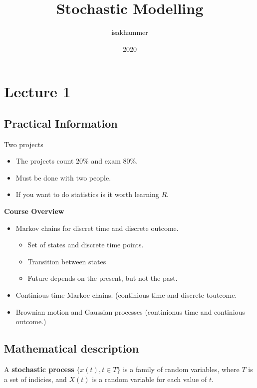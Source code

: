 \documentclass{article}
\title{Stochastic Modelling}
\author{isakhammer }
\date{2020}
\theoremstyle{remark}
\begin{document}
\maketitle
\tableofcontents
\newpage

\newpage
\section{Lecture 1}%
\label{sec:lecture_1}

\subsection{Practical Information}%
\label{sub:practical_information}

Two projects
\begin{itemize}
  \item The projects count $20 \%$ and exam $80 \%$.
  \item Must be done with two people.
  \item If you want to do statistics is it worth learning $R$.
\end{itemize}

\textbf{Course Overview}
\begin{itemize}
  \item Markov chains for discret time and discrete outcome.
    \begin{itemize}
      \item Set of states and discrete time points.
      \item Transition between states
      \item Future depends on the present, but not the past.
    \end{itemize}
  \item Continious time Markoc chains. (continious time and discrete toutcome.
  \item Brownian motion and Gaussian processes (continionus time and continious outcome.)
\end{itemize}


\subsection{Mathematical description}%
\label{sub:mathematical_description}
 \begin{definition}
   A \textbf{stochastic process} $\{ x\left( t \right), t \in T\} $ is a family of random variables, where $T$ is a set of indicies, and $X\left( t \right)$ is a random variable for each value of $t$.
 \end{definition}
\end{document}
